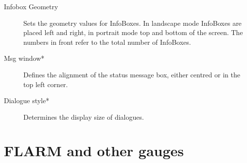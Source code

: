\begin{description}
\item[Infobox Geometry]  Sets the geometry values for InfoBoxes. In landscape
mode InfoBoxes are placed left and right, in portrait mode top and bottom of the screen. The numbers in front refer 
to the total number of InfoBoxes.
\item[Msg window*]  Defines the alignment of the status message box, either
centred or in the top left corner.
\item[Dialogue style*]  Determines the display size of dialogues.
\end{description}


\clearpage
\section{FLARM and other gauges}\label{sec:vario-gauge}

